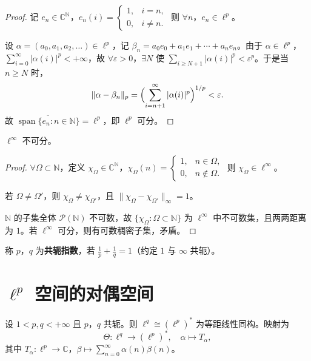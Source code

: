 \documentclass[lang=cn,a4paper,newtx,section]{elegantbook}
\begin{document}
\begin{proof}
  记 $e_n\in\mathbb{C}^{\mathbb{N}}$，$e_n(i)=\begin{cases}1,&i=n,\\0,&i\neq n.\end{cases}$ 则 $\forall n$，$e_n\in\ell^p$。

  设 $\alpha=(a_0,a_1,a_2,\ldots)\in\ell^p$，记 $\beta_n=a_0e_0+a_1e_1+\cdots+a_ne_n$。由于 $\alpha\in\ell^p$，$\sum_{i=0}^{\infty}|\alpha(i)|^p<+\infty$，故 $\forall\varepsilon>0$，$\exists N$ 使 $\sum_{i\geq N+1}|\alpha(i)|^p<\varepsilon^p$。于是当 $n\geq N$ 时，
  \[
    \|\alpha-\beta_n\|_p=\Bigl(\sum_{i=n+1}^{\infty}|\alpha(i)|^p\Bigr)^{1/p}<\varepsilon.
  \]
  故 $\overline{\operatorname{span}\{e_n:n\in\mathbb{N}\}}=\ell^p$，即 $\ell^p$ 可分。
\end{proof}

\begin{proposition}
  $\ell^\infty$ 不可分。
\end{proposition}

\begin{proof}
  $\forall\Omega\subset\mathbb{N}$，定义 $\chi_\Omega\in\mathbb{C}^{\mathbb{N}}$，$\chi_\Omega(n)=\begin{cases}1,&n\in\Omega,\\0,&n\notin\Omega.\end{cases}$ 则 $\chi_\Omega\in\ell^\infty$。

  若 $\Omega\neq\Omega'$，则 $\chi_\Omega\neq\chi_{\Omega'}$，且 $\|\chi_\Omega-\chi_{\Omega'}\|_\infty=1$。

  $\mathbb{N}$ 的子集全体 $\mathcal{P}(\mathbb{N})$ 不可数，故 $\{\chi_\Omega:\Omega\subset\mathbb{N}\}$ 为 $\ell^\infty$ 中不可数集，且两两距离为 $1$。若 $\ell^\infty$ 可分，则有可数稠密子集，矛盾。
\end{proof}

\begin{remark}
  称 $p$，$q$ 为\textbf{共轭指数}，若 $\frac{1}{p}+\frac{1}{q}=1$（约定 $1$ 与 $\infty$ 共轭）。
\end{remark}

\section{\texorpdfstring{$\ell^p$}{lp} 空间的对偶空间}

\begin{theorem}
  设 $1<p,q<+\infty$ 且 $p$，$q$ 共轭。则 $\ell^q\cong(\ell^p)^*$ 为等距线性同构。映射为
  \[
    \Theta:\ell^q\to(\ell^p)^*,\quad\alpha\mapsto T_\alpha,
  \]
  其中 $T_\alpha:\ell^p\to\mathbb{C}$，$\beta\mapsto\sum_{n=0}^{\infty}\alpha(n)\beta(n)$。
\end{theorem}
\end{document}
